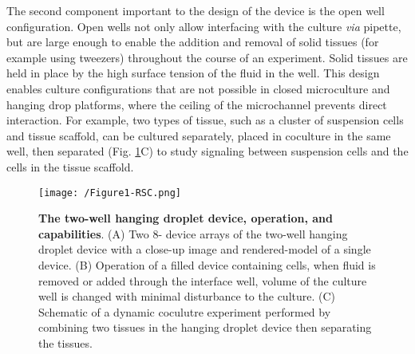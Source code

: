 The second component important to the design of the device is the open well configuration. Open wells not only allow interfacing with the culture \textit{via} pipette, but are large enough to enable the addition and removal of solid tissues (for example using tweezers) throughout the course of an experiment. Solid tissues are held in place by the high surface tension of the fluid in the well. This design enables culture configurations that are not possible in closed microculture and hanging drop platforms, where the ceiling of the microchannel prevents direct interaction. For example, two types of tissue, such as a cluster of suspension cells and tissue scaffold, can be cultured separately, placed in coculture in the same well, then separated (Fig. \ref{figure:Fig1}C) to study signaling between suspension cells and the cells in the tissue scaffold.

\begin{figure}[ht] %
\centering
\texttt{[image: /Figure1-RSC.png]}
\caption{\textbf{The two-well hanging droplet device, operation, and capabilities}. (A) Two 8- device arrays of the two-well hanging droplet device with a close-up image and rendered-model of a single device. (B) Operation of a filled device containing cells, when fluid is removed or added through the interface well, volume of the culture well is changed with minimal disturbance to the culture. (C) Schematic of a dynamic coculutre experiment performed by combining two tissues in the hanging droplet device then separating the tissues.}
\label{figure:Fig1}
\end{figure}


